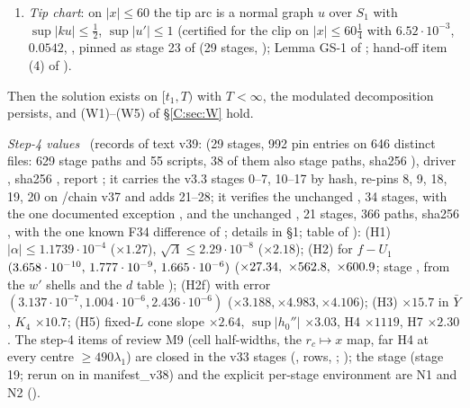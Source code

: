 \documentclass[11pt]{article}
\begin{document}
\begin{theorem}
\begin{enumerate}[label=\textup{(H\arabic*)},leftmargin=*]
\item[\textup{(GS)}] \emph{Tip chart}: on $|x|\le60$ the tip arc is a normal graph $u$ over $S_1$ with $\sup|ku|\le\frac12$, $\sup|u'|\le1$ (certified for the clip on $|x|\le60\frac14$ with $6.52\cdot10^{-3}$, $0.0542$, , pinned as stage 23 of  (29 stages, ); Lemma GS-1 of ; hand-off item (4) of ).
\end{enumerate}
Then the solution exists on $[t_1,T)$ with $T<\infty$, the modulated decomposition persists, and (W1)--(W5) of \S\ref{C:sec:W} hold.
\end{theorem}
\noindent\emph{Step-4 values} \tC\ (records of text v39:  (29 stages, 992 pin entries on 646 distinct files: 629 stage paths and 55 scripts, 38 of them also stage paths, sha256 ), driver , sha256 , report ; it carries the v3.3 stages 0--7, 10--17 by hash, re-pins 8, 9, 18, 19, 20 on /chain v37 and adds 21--28; it verifies the unchanged , 34 stages, with the one documented exception , and the unchanged , 21 stages, 366 paths, sha256 , with the one known F34 difference of ; details in  \S1; table of ): (H1) $|\alpha|\le1.1739\cdot10^{-4}$ ($\times1.27$), $\sqrt\Lambda\le2.29\cdot10^{-8}$ ($\times2.18$); (H2) for $f-U_1$ $(3.658\cdot10^{-10},\,1.777\cdot10^{-9},\,1.665\cdot10^{-6})$ ($\times27.34,\ \times562.8,\ \times600.9$; stage , from the $w'$ shells and the $d$ table ); (H2f) with error $(3.137\cdot10^{-7},1.004\cdot10^{-6},2.436\cdot10^{-6})$ ($\times3.188,\times4.983,\times4.106$); (H3) $\times15.7$ in $\bar Y$, $K_4$ $\times10.7$; (H5) fixed-$L$ cone slope $\times2.64$, $\sup|h_0''|$ $\times3.03$, H4 $\times1119$, H7 $\times2.30$. The step-4 items of review M9 (cell half-widths, the $r_c\mapsto x$ map, far H4 at every centre $\ge490\lambda_1$) are closed in the v33 stages (,  rows, ; ); the stage  (stage 19; rerun on  in manifest\_v38) and the explicit per-stage environment are N1 and N2 ().
\end{document}
